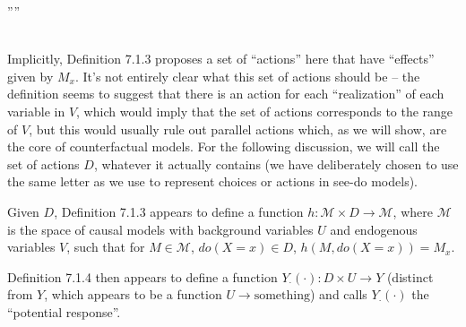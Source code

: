 ''''

\\

Implicitly, Definition 7.1.3 proposes a set of ``actions'' here that have ``effects'' given by $M_x$. It's not entirely clear what this set of actions should be -- the definition seems to suggest that there is an action for each ``realization'' of each variable in $V$, which would imply that the set of actions corresponds to the range of $V$, but this would usually rule out parallel actions which, as we will show, are the core of counterfactual models. For the following discussion, we will call the set of actions $D$, whatever it actually contains (we have deliberately chosen to use the same letter as we use to represent choices or actions in see-do models).

Given $D$, Definition 7.1.3 appears to define a function $h:\mathscr{M}\times D\to \mathscr{M}$, where $\mathscr{M}$ is the space of causal models with background variables $U$ and endogenous variables $V$, such that for $M\in \mathscr{M}$, $do(X=x)\in D$, $h(M,do(X=x))=M_x$.

Definition 7.1.4 then appears to define a function $Y_\cdot(\cdot):D\times U\to Y$ (distinct from $Y$, which appears to be a function $U\to\text{something}$) and calls $Y_\cdot(\cdot)$ the ``potential response''.

